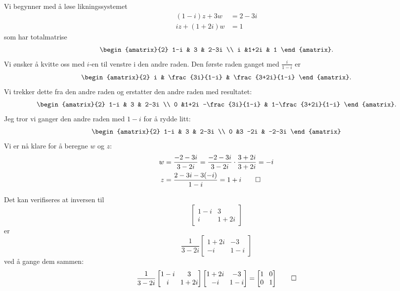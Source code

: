 \begin{ex}
Vi begynner med å løse likningssystemet
\begin{align*}
(1-i) z + 3w   &= 2-3i \\
i z + (1+2i) w &= 1
\end{align*}
som har totalmatrise
\[
\begin{amatrix}{2}
1-i & 3 & 2-3i \\ i &1+2i & 1
\end{amatrix}.
\]
Vi ønsker å kvitte oss med $i$-en til venstre i den andre raden. 
Den første raden ganget  med $\frac{i}{1-i}$ er
\[
\begin{amatrix}{2}
i & \frac{3i}{1-i} & \frac{3+2i}{1-i} 
\end{amatrix}.
\]
Vi trekker dette fra den andre raden og erstatter den andre raden med resultatet:
\[
\begin{amatrix}{2}
1-i & 3 & 2-3i \\ 0 &1+2i -\frac{3i}{1-i} & 1-\frac{3+2i}{1-i} 
\end{amatrix}.
\]
Jeg tror vi ganger den andre raden med $1-i$ for å rydde litt:
\[
\begin{amatrix}{2}
1-i & 3 & 2-3i \\ 0 &3 -2i  & -2-3i
\end{amatrix}
\]
Vi er nå klare for å beregne $w$ og $z$:
\begin{align*}
w&=\frac{-2-3i}{3-2i}=\frac{-2-3i}{3-2i}\cdot \frac{3+2i}{3+2i}=-i \\
z&=\frac{2-3i-3(-i)}{1-i}=1+i \qedhere
\end{align*}
\end{ex}

\begin{ex}
Det kan verifiseres at inversen til 
\[
\begin{bmatrix}
1-i & 3  \\ i &1+2i 
\end{bmatrix}
\]
er
\[
\frac{1}{3-2i}
\begin{bmatrix}
1+2i & -3  \\ -i &1-i 
\end{bmatrix}
\]
ved å gange dem sammen:
\[
\frac{1}{3-2i}
\setlength\arraycolsep{4pt}
\begin{bmatrix}
1-i & 3  \\ i &1+2i 
\end{bmatrix}
\begin{bmatrix}
1+2i & -3  \\ -i &1-i 
\end{bmatrix}
=
\begin{bmatrix}
1 & 0  \\ 0 &1 
\end{bmatrix} \qedhere
\]


\end{ex}

